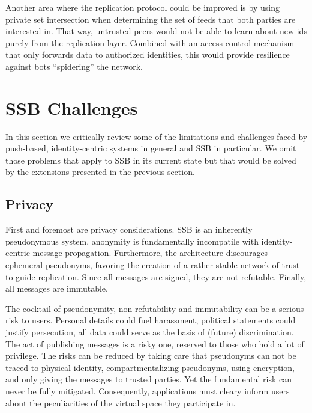 \documentclass[10pt,sigconf]{acmart}
\begin{document}
Another area where the replication protocol could be improved is by using private set intersection when determining the set of feeds that both parties are interested in. That way, untrusted peers would not be able to learn about new ids purely from the replication layer. Combined with an access control mechanism that only forwards data to authorized identities, this would provide resilience against bots ``spidering'' the network.

%

\section{SSB Challenges}

In this section we critically review some of the limitations and challenges faced by push-based, identity-centric systems in general and SSB in particular. We omit those problems that apply to SSB in its current state but that would be solved by the extensions presented in the previous section.

\subsection{Privacy}

First and foremost are privacy considerations. SSB is an inherently pseudonymous system, anonymity is fundamentally incompatile with identity-centric message propagation. Furthermore, the architecture discourages ephemeral pseudonyms, favoring the creation of a rather stable network of trust to guide replication. Since all messages are signed, they are not refutable. Finally, all messages are immutable.

The cocktail of pseudonymity, non-refutability and immutability can be a serious risk to users. Personal details could fuel harassment, political statements could justify persecution, all data could serve as the basis of (future) discrimination. The act of publishing messages is a risky one, reserved to those who hold a lot of privilege. The risks can be reduced by taking care that pseudonyms can not be traced to physical identity, compartmentalizing pseudonyms, using encryption, and only giving the messages to trusted parties. Yet the fundamental risk can never be fully mitigated. Consequently, applications must cleary inform users about the peculiarities of the virtual space they participate in.
\end{document}
